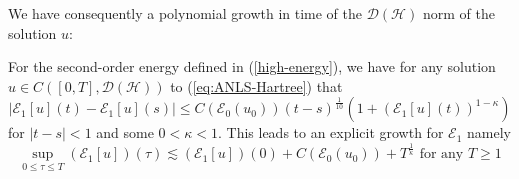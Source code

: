 We have consequently a polynomial growth in time of the $\mathcal{D} (\mathcal{H})$
norm of the solution $u$:
\begin{prop}
  \label{prop:higher-energy-gronwall}For the second-order energy defined in
  (\ref{high-energy}), we have for any solution $u \in C ([0, T], \mathcal{D}
  (\mathcal{H}))$ to (\ref{eq:ANLS-Hartree}) that
  \begin{equation}
    |\mathcal{E}_1 [u] (t) -\mathcal{E}_1 [u] (s)| \leq C (\mathcal{E}_0 (u_0))
    (t - s)^{\frac{1}{10}} (1 + (\mathcal{E}_1 [u] (t))^{1 - \kappa})
    \label{prop:energyincr}
  \end{equation}
  for $| t - s | < 1$ and some $0 < \kappa < 1$. This leads to an explicit growth for $\mathcal{E}_1$ namely
  \begin{equation}
    \underset{0 \leqslant \tau \leqslant T}{\sup} (\mathcal{E}_1 [u]) (\tau)
    \lesssim (\mathcal{E}_1 [u]) (0) + C (\mathcal{E}_0 (u_0)) +
    T^{\frac{1}{\kappa}}  \text{ for any } T \geqslant 1
    \label{prop:normgrowth}
  \end{equation}
\end{prop}
